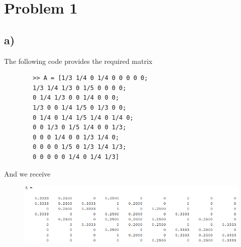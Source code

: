 \documentclass[12pt,en,a4paper]{article}
\begin{document}
	\section*{Problem 1}
	\subsection*{a)}
	The following code provides the required matrix
	\begin{mdframed}[hidealllines=true,backgroundcolor=magenta!10]
		\begin{lstlisting}
		>> A = [1/3 1/4 0 1/4 0 0 0 0 0;
		1/3 1/4 1/3 0 1/5 0 0 0 0;
		0 1/4 1/3 0 0 1/4 0 0 0;
		1/3 0 0 1/4 1/5 0 1/3 0 0;
		0 1/4 0 1/4 1/5 1/4 0 1/4 0;
		0 0 1/3 0 1/5 1/4 0 0 1/3;
		0 0 0 1/4 0 0 1/3 1/4 0;
		0 0 0 0 1/5 0 1/3 1/4 1/3;
		0 0 0 0 0 1/4 0 1/4 1/3]
		\end{lstlisting}
	\end{mdframed}
	And we receive
	\begin{figure}[H]
		\centering
		\includegraphics[scale=0.7]{prob1a.png}
		\label{prob1a}
	\end{figure}
\end{document}
